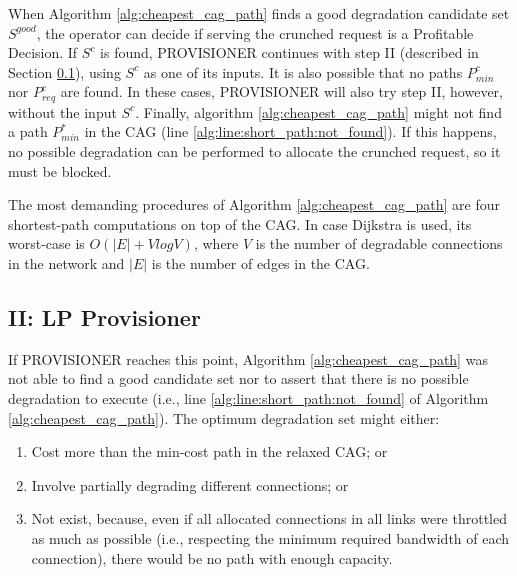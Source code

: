 \documentclass[journal]{IEEEtran}
\begin{document}
When Algorithm \ref{alg:cheapest_cag_path} finds a good degradation candidate set $S^{good}$, the operator can decide if serving the crunched request is a Profitable Decision. If $S^{c}$ is found, PROVISIONER continues with step II (described in Section \ref{subsection:notfitindegradable}), using $S^{c}$ as one of its inputs. It is also possible that no paths $P^{c}_{min}$ nor $P^{c}_{req}$ are found. In these cases, PROVISIONER will also try step II, however, without the input $S^{c}$. Finally, algorithm \ref{alg:cheapest_cag_path} might not find a path $P^{*}_{min}$ in the CAG (line \ref{alg:line:short_path:not_found}). If this happens, no possible degradation can be performed to allocate the crunched request, so it must be blocked.

The most demanding procedures of Algorithm \ref{alg:cheapest_cag_path} are four shortest-path computations on top of the CAG. In case Dijkstra is used, its worst-case is $O(|E| + V log V)$, where $V$ is the number of degradable connections in the network and $|E|$ is the number of edges in the CAG.%

\subsection{\textbf{II: LP Provisioner}}\label{subsection:notfitindegradable}

If PROVISIONER reaches this point, Algorithm \ref{alg:cheapest_cag_path} was not able to find a good candidate set nor to assert that there is no possible degradation to execute (i.e., line \ref{alg:line:short_path:not_found} of Algorithm \ref{alg:cheapest_cag_path}). The optimum degradation set might either:
\begin{enumerate}[label=\textit{\alph*.}]
 \item Cost more than the min-cost path in the relaxed CAG; or
 \item Involve partially degrading different connections; or
 \item Not exist, because, even if all allocated connections in all links were throttled as much as possible (i.e., respecting the minimum required bandwidth of each connection), there would be no path with enough capacity.
\end{enumerate}
\end{document}
